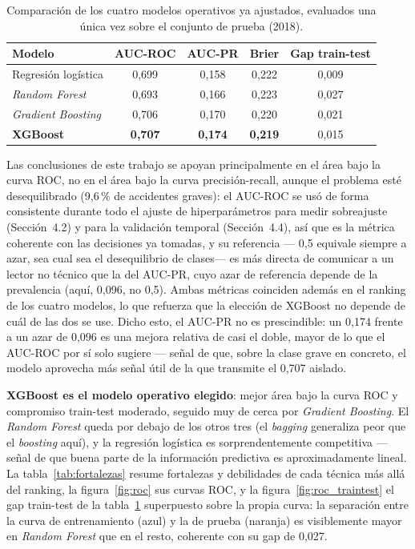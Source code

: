 \documentclass[11pt,a4paper]{article}
\begin{document}
\begin{table}[h]
\centering
\small
\begin{tabular}{lcccc}
\toprule
\textbf{Modelo} & \textbf{AUC-ROC} & \textbf{AUC-PR} & \textbf{Brier} & \textbf{Gap train-test} \\
\midrule
Regresión logística & 0,699 & 0,158 & 0,222 & 0,009 \\
\emph{Random Forest} & 0,693 & 0,166 & 0,223 & 0,027 \\
\emph{Gradient Boosting} & 0,706 & 0,170 & 0,220 & 0,021 \\
\textbf{XGBoost} & \textbf{0,707} & \textbf{0,174} & \textbf{0,219} & 0,015 \\
\bottomrule
\end{tabular}
\caption{Comparación de los cuatro modelos operativos ya ajustados, evaluados una única vez sobre el conjunto de prueba (2018).}
\label{tab:comparacion_operativo}
\end{table}

Las conclusiones de este trabajo se apoyan principalmente en el área bajo la curva ROC, no en el área bajo la curva precisión-recall, aunque el problema esté desequilibrado (9,6\,\% de accidentes graves): el AUC-ROC se usó de forma consistente durante todo el ajuste de hiperparámetros para medir sobreajuste (Sección~4.2) y para la validación temporal (Sección~4.4), así que es la métrica coherente con las decisiones ya tomadas, y su referencia --- 0,5 equivale siempre a azar, sea cual sea el desequilibrio de clases--- es más directa de comunicar a un lector no técnico que la del AUC-PR, cuyo azar de referencia depende de la prevalencia (aquí, 0,096, no 0,5). Ambas métricas coinciden además en el ranking de los cuatro modelos, lo que refuerza que la elección de XGBoost no depende de cuál de las dos se use. Dicho esto, el AUC-PR no es prescindible: un 0,174 frente a un azar de 0,096 es una mejora relativa de casi el doble, mayor de lo que el AUC-ROC por sí solo sugiere --- señal de que, sobre la clase grave en concreto, el modelo aprovecha más señal útil de la que transmite el 0,707 aislado.

\textbf{XGBoost es el modelo operativo elegido}: mejor área bajo la curva ROC y compromiso train-test moderado, seguido muy de cerca por \emph{Gradient Boosting}. El \emph{Random Forest} queda por debajo de los otros tres (el \emph{bagging} generaliza peor que el \emph{boosting} aquí), y la regresión logística es sorprendentemente competitiva --- señal de que buena parte de la información predictiva es aproximadamente lineal. La tabla~\ref{tab:fortalezas} resume fortalezas y debilidades de cada técnica más allá del ranking, la figura~\ref{fig:roc} sus curvas ROC, y la figura~\ref{fig:roc_traintest} el gap train-test de la tabla~\ref{tab:comparacion_operativo} superpuesto sobre la propia curva: la separación entre la curva de entrenamiento (azul) y la de prueba (naranja) es visiblemente mayor en \emph{Random Forest} que en el resto, coherente con su gap de 0,027.
\end{document}

